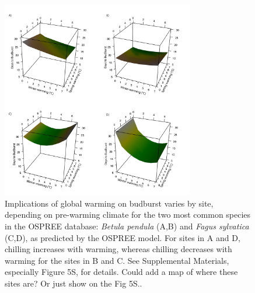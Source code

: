 \documentclass{article}
\begin{document}
\begin{figure}[h!]
\centering
\noindent \includegraphics[width=0.75\textwidth]{..//..//analyses/bb_analysis/figures/forecasting/bbmod_3dplot_utah_obs.pdf}
\caption{Implications of global warming on budburst varies by site, depending on pre-warming climate for the two most common species in the OSPREE database: \emph{Betula pendula} (A,B) and \emph{Fagus sylvatica} (C,D), as predicted by the OSPREE model. For sites in A and D, chilling increases with warming, whereas chilling decreases with warming for the sites in B and C. See Supplemental Materials, especially Figure 5S, for details. Could add a map of where these sites are? Or just show on the Fig 5S..}
\label{fig:fore}
\end{figure}

\end{document}
